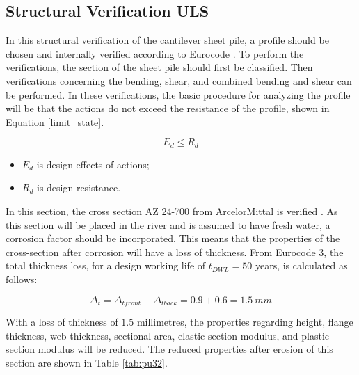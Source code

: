 \newpage

\subsection{Structural Verification ULS}
\label{section:structural_verification_uls}

In this structural verification of the cantilever sheet pile, a profile should be chosen and internally verified according to Eurocode \autocite{eurocodeEurocode3Design2007}. To perform the verifications, the section of the sheet pile should first be classified. Then verifications concerning the bending, shear, and combined bending and shear can be performed. In these verifications, the basic procedure for analyzing the profile will be that the actions do not exceed the resistance of the profile, shown in Equation \ref{limit_state}.

\begin{equation}
    E_{d} \leq R_{d}
    \label{limit_state}
\end{equation}

\begin{itemize}
    \item $E_{d}$ is design effects of actions;
    \item $R_{d}$ is design resistance.
\end{itemize}

In this section, the cross section AZ 24-700 from ArcelorMittal is verified \autocite{baxterPilingHandbook2022}. As this section will be placed in the river and is assumed to have fresh water, a corrosion factor should be incorporated. This means that the properties of the cross-section after corrosion will have a loss of thickness. From Eurocode 3, the total thickness loss, for a design working life of $t_{DWL} = 50$ years, is calculated as follows:

\begin{equation}
    \Delta_{t} = \Delta_{tfront} +  \Delta_{tback} = 0.9 + 0.6= 1.5 \ mm 
\end{equation}

With a loss of thickness of $1.5$ millimetres, the properties regarding height, flange thickness, web thickness, sectional area, elastic section modulus, and plastic section modulus will be reduced. The reduced properties after erosion of this section are shown in Table \ref{tab:pu32}.


